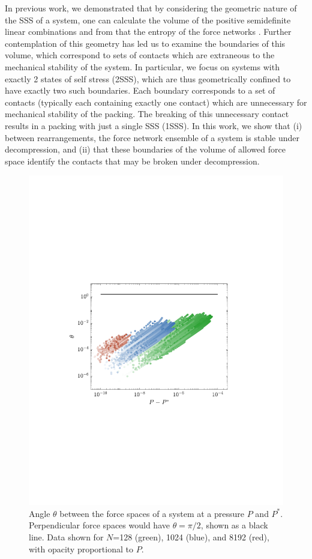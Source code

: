 In previous work, we demonstrated that by considering the geometric nature of the SSS of a system, one can calculate the volume of the positive semidefinite linear combinations and from that the entropy of the force networks \cite{sartor_direct_2020}. Further contemplation of this geometry has led us to examine the boundaries of this volume, which correspond to sets of contacts which are extraneous to the mechanical stability of the system. In particular, we focus on systems with exactly 2 states of self stress (2SSS), which are thus geometrically confined to have exactly two such boundaries. Each boundary corresponds to a set of contacts (typically each containing exactly one contact) which are unnecessary for mechanical stability of the packing. The breaking of this unnecessary contact results in a packing with just a single SSS (1SSS). In this work, we show that (i) between rearrangements, the force network ensemble of a system is stable under decompression, and (ii) that these boundaries of the volume of allowed force space identify the contacts that may be broken under decompression. 



\begin{figure}[t!]
\includegraphics[width=\columnwidth, trim=94 242 130 260, clip]{contactBreakingPaper/angleVsPressure.pdf}
\caption{Angle $\theta$ between the force spaces of a system at a pressure $P$ and $P^*$. Perpendicular force spaces would have $\theta = \pi/2$, shown as a black line. Data shown for $N$=128 (green), 1024 (blue), and 8192 (red), with opacity proportional to $P$.}
\label{plot:anglevpressure}
\end{figure}

